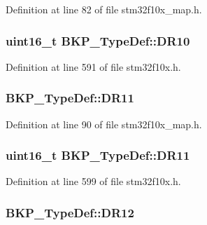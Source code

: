 Definition at line 82 of file stm32f10x\+\_\+map.\+h.

\subsubsection[{\texorpdfstring{D\+R10}{DR10}}]{ {\bf uint16\+\_\+t} B\+K\+P\+\_\+\+Type\+Def\+::\+D\+R10}\hypertarget{struct_b_k_p___type_def_a36060bb3e662e5c2370892caf1a19da6}{}\label{struct_b_k_p___type_def_a36060bb3e662e5c2370892caf1a19da6}


Definition at line 591 of file stm32f10x.\+h.

\subsubsection[{\texorpdfstring{D\+R11}{DR11}}]{ B\+K\+P\+\_\+\+Type\+Def\+::\+D\+R11}\hypertarget{struct_b_k_p___type_def_a4fd318e25d7f5328946cab995679900e}{}\label{struct_b_k_p___type_def_a4fd318e25d7f5328946cab995679900e}


Definition at line 90 of file stm32f10x\+\_\+map.\+h.

\subsubsection[{\texorpdfstring{D\+R11}{DR11}}]{ {\bf uint16\+\_\+t} B\+K\+P\+\_\+\+Type\+Def\+::\+D\+R11}\hypertarget{struct_b_k_p___type_def_af0938123a38313da403033b8f8d7bc5c}{}\label{struct_b_k_p___type_def_af0938123a38313da403033b8f8d7bc5c}


Definition at line 599 of file stm32f10x.\+h.

\subsubsection[{\texorpdfstring{D\+R12}{DR12}}]{ B\+K\+P\+\_\+\+Type\+Def\+::\+D\+R12}\hypertarget{struct_b_k_p___type_def_a3604e297477b5970842cca1282b21b8f}{}\label{struct_b_k_p___type_def_a3604e297477b5970842cca1282b21b8f}


